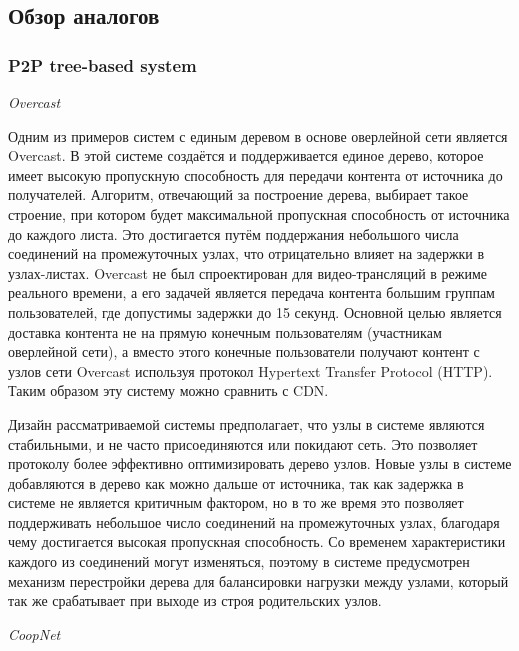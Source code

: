 	\subsection{Обзор аналогов}
		\subsubsection{P2P tree-based system}

		\textit{Overcast}

		Одним из примеров систем с единым деревом в основе оверлейной сети является Overcast. В этой системе
		создаётся и поддерживается единое дерево, которое имеет высокую пропускную способность для передачи контента от
		источника до получателей. Алгоритм, отвечающий за построение дерева, выбирает такое строение, при котором будет
		максимальной пропускная способность от источника до каждого листа. Это достигается путём поддержания небольшого
		числа соединений на промежуточных узлах, что отрицательно влияет на задержки в узлах-листах. Overcast не был
		спроектирован для видео-трансляций в режиме реального времени, а его задачей является передача контента большим
		группам пользователей, где допустимы задержки до 15 секунд. Основной целью является доставка контента не на
		прямую конечным пользователям (участникам оверлейной сети), а вместо этого конечные пользователи получают
		контент с узлов сети Overcast используя протокол Hypertext Transfer Protocol (HTTP). Таким образом эту
		систему можно сравнить с CDN.

		Дизайн рассматриваемой системы предполагает, что узлы в системе являются стабильными, и не часто присоединяются
		или покидают сеть. Это позволяет протоколу более эффективно оптимизировать дерево узлов. Новые узлы в системе
		добавляются в дерево как можно дальше от источника, так как задержка в системе не является критичным фактором,
		но в то же время это позволяет поддерживать небольшое число соединений на промежуточных узлах, благодаря чему
		достигается высокая пропускная способность. Со временем характеристики каждого из соединений могут изменяться,
		поэтому в системе предусмотрен механизм перестройки дерева для балансировки нагрузки между узлами, который так
		же срабатывает при выходе из строя родительских узлов.

		\textit{CoopNet}

